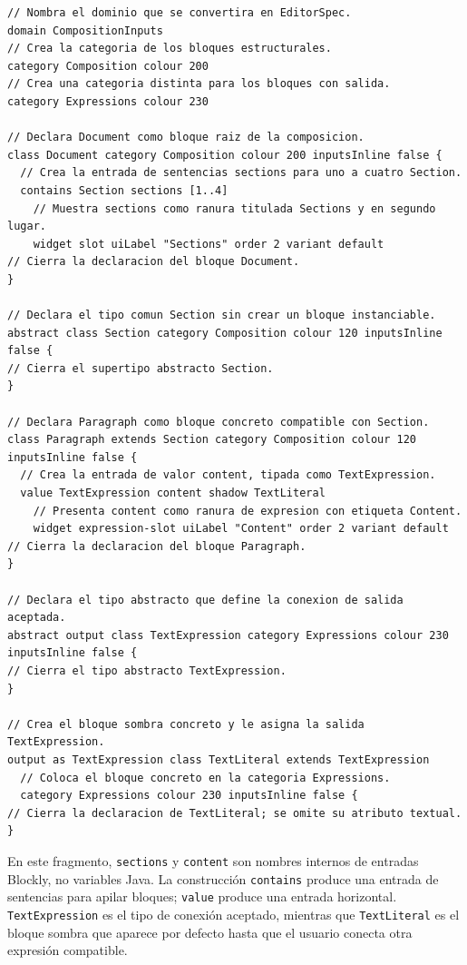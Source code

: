 \begin{lstlisting}[style=tfmm2b, captionpos=t, caption={Fragmento clave de \texttt{03\_composition\_inputs} comentado línea a línea}, label={lst:composition-inputs-dsl}]
// Nombra el dominio que se convertira en EditorSpec.
domain CompositionInputs
// Crea la categoria de los bloques estructurales.
category Composition colour 200
// Crea una categoria distinta para los bloques con salida.
category Expressions colour 230

// Declara Document como bloque raiz de la composicion.
class Document category Composition colour 200 inputsInline false {
  // Crea la entrada de sentencias sections para uno a cuatro Section.
  contains Section sections [1..4]
    // Muestra sections como ranura titulada Sections y en segundo lugar.
    widget slot uiLabel "Sections" order 2 variant default
// Cierra la declaracion del bloque Document.
}

// Declara el tipo comun Section sin crear un bloque instanciable.
abstract class Section category Composition colour 120 inputsInline false {
// Cierra el supertipo abstracto Section.
}

// Declara Paragraph como bloque concreto compatible con Section.
class Paragraph extends Section category Composition colour 120 inputsInline false {
  // Crea la entrada de valor content, tipada como TextExpression.
  value TextExpression content shadow TextLiteral
    // Presenta content como ranura de expresion con etiqueta Content.
    widget expression-slot uiLabel "Content" order 2 variant default
// Cierra la declaracion del bloque Paragraph.
}

// Declara el tipo abstracto que define la conexion de salida aceptada.
abstract output class TextExpression category Expressions colour 230 inputsInline false {
// Cierra el tipo abstracto TextExpression.
}

// Crea el bloque sombra concreto y le asigna la salida TextExpression.
output as TextExpression class TextLiteral extends TextExpression
  // Coloca el bloque concreto en la categoria Expressions.
  category Expressions colour 230 inputsInline false {
// Cierra la declaracion de TextLiteral; se omite su atributo textual.
}
\end{lstlisting}

En este fragmento, \texttt{sections} y \texttt{content} son nombres internos
de entradas Blockly, no variables Java. La construcción \texttt{contains}
produce una entrada de sentencias para apilar bloques; \texttt{value} produce
una entrada horizontal. \texttt{TextExpression} es el tipo de conexión
aceptado, mientras que \texttt{TextLiteral} es el bloque sombra que aparece por
defecto hasta que el usuario conecta otra expresión compatible.

